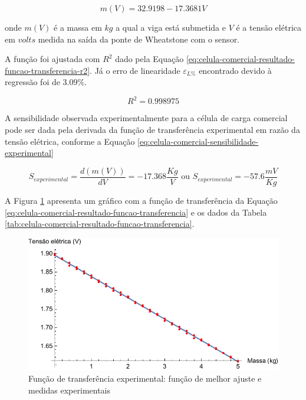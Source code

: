 \documentclass[a4paper]{instrumentacao}
\begin{document}
\begin{equation}
	m(V) = 32.9198 - 17.3681 V
	\label{eq:celula-comercial-resultado-funcao-transferencia}
\end{equation}

\noindent onde $m(V)$ é a massa em $kg$ a qual a viga está submetida e $V$ é a tensão elétrica em $volts$ medida na saída da ponte de Wheatstone com o sensor.

A função foi ajustada com $R^2$ dado pela Equação \ref{eq:celula-comercial-resultado-funcao-transferencia-r2}. Já o erro de linearidade $\varepsilon_{L\%}$ encontrado devido à regressão foi de $3.09\%$.

\begin{equation}
	R^2 = 0.998975
	\label{eq:celula-comercial-resultado-funcao-transferencia-r2}
\end{equation}

A sensibilidade observada experimentalmente para a célula de carga comercial pode ser dada pela derivada da função de transferência experimental em razão da tensão elétrica, conforme a Equação \ref{eq:celula-comercial-sensibilidade-experimental}

\begin{equation}
	S_{experimental}=\frac{d (m(V))}{d V }=-17.368\frac{Kg}{V} \textrm{ ou } S_{experimental}=-57.6\frac{mV}{Kg}
	\label{eq:celula-comercial-sensibilidade-experimental}
\end{equation}


A Figura \ref{fig:celula-comercial-resultado-funcao-transferencia} apresenta um gráfico com a função de transferência da Equação \ref{eq:celula-comercial-resultado-funcao-transferencia} e os dados da Tabela \ref{tab:celula-comercial-resultado-funcao-transferencia}.

\begin{figure}[H]
\center
\includegraphics[width=\textwidth]{Comercial-Plot.pdf}
\caption{Função de transferência experimental: função de melhor ajuste e medidas experimentais}
\label{fig:celula-comercial-resultado-funcao-transferencia}
\end{figure}
\end{document}
